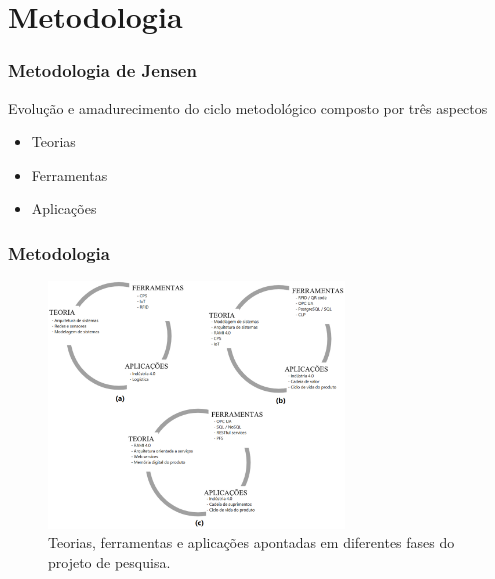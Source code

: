 \documentclass[10pt]{beamer}
\begin{document}
\section{Metodologia}
\begin{frame}
	
	\frametitle{Metodologia de Jensen}
	
	Evolução e amadurecimento do ciclo metodológico composto por três aspectos
	\begin{itemize}
		\item Teorias 
		\item Ferramentas
		\item Aplicações
	\end{itemize}
	
\end{frame}
\begin{frame}
	
	\frametitle{Metodologia}
	
	\begin{figure}[htb]
		\centering
		\caption{Teorias, ferramentas e aplicações apontadas em diferentes fases do projeto de pesquisa.}
		\label{fig:metodologia-jensen-projeto}
		\includegraphics[width=0.7\textwidth]{metodologia-jensen-projeto.png}
	\end{figure}
	
\end{frame}
\end{document}
